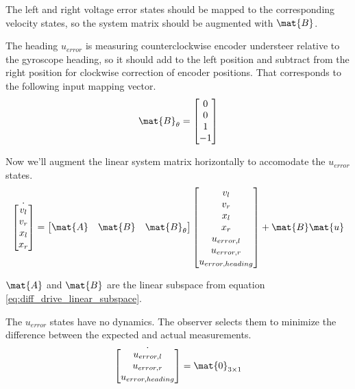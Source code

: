 The left and right voltage error states should be mapped to the corresponding
velocity states, so the system matrix should be augmented with $\mat{B}$.

The heading $u_{error}$ is measuring counterclockwise encoder understeer
relative to the gyroscope heading, so it should add to the left position and
subtract from the right position for clockwise correction of encoder positions.
That corresponds to the following input mapping vector.
\begin{equation*}
  \mat{B}_{\theta} = \begin{bmatrix}
    0 \\
    0 \\
    1 \\
    -1
  \end{bmatrix}
\end{equation*}

Now we'll augment the linear system matrix horizontally to accomodate the
$u_{error}$ states.
\begin{equation}
  \dot{\begin{bmatrix}
    v_l \\
    v_r \\
    x_l \\
    x_r
  \end{bmatrix}} =
    \begin{bmatrix}
      \mat{A} & \mat{B} & \mat{B}_{\theta}
    \end{bmatrix}
    \begin{bmatrix}
      v_l \\
      v_r \\
      x_l \\
      x_r \\
      u_{error,l} \\
      u_{error,r} \\
      u_{error,heading}
    \end{bmatrix} + \mat{B}\mat{u}
\end{equation}

$\mat{A}$ and $\mat{B}$ are the linear subspace from equation
\eqref{eq:diff_drive_linear_subspace}.

The $u_{error}$ states have no dynamics. The observer selects them to minimize
the difference between the expected and actual measurements.
\begin{equation}
  \dot{\begin{bmatrix}
    u_{error,l} \\
    u_{error,r} \\
    u_{error,heading}
  \end{bmatrix}} = \mat{0}_{3 \times 1}
\end{equation}

